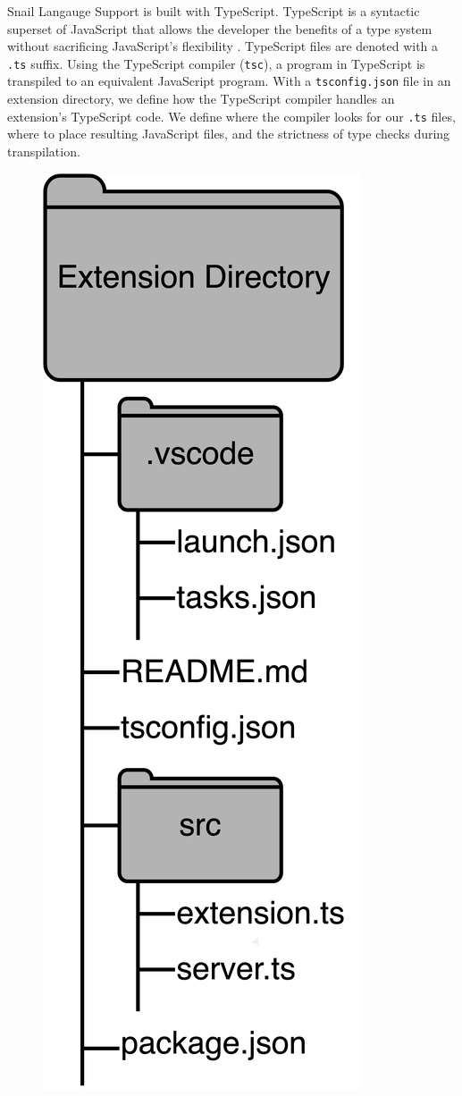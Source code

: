 \documentclass{article}
\begin{document}
Snail Langauge Support is built with TypeScript. TypeScript is a syntactic superset of JavaScript that allows the developer the benefits of a type system without sacrificing JavaScript's flexibility \cite{TypeScript_2023}. TypeScript files are denoted with a \lstinline{.ts} suffix. Using the TypeScript compiler (\lstinline{tsc}), a program in TypeScript is transpiled to an equivalent JavaScript program. With a \lstinline{tsconfig.json} file in an extension directory, we define how the TypeScript compiler handles an extension's TypeScript code. We define where the compiler looks for our \lstinline{.ts} files, where to place resulting JavaScript files, and the strictness of type checks during transpilation.


\begin{figure}
    \begin{center}
        \includegraphics[height=0.3\textheight]{png/directory-structure.png}

\end{center}
\end{figure}
\end{document}

